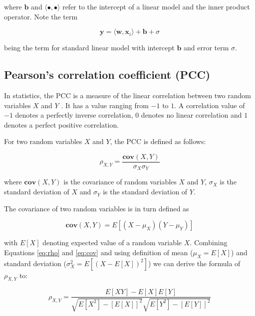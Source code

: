 \documentclass[pdftex,12pt,a4paper]{report}
\begin{document}
where $\mathbf{b}$ and $\langle \bullet , \bullet \rangle$ refer to the intercept of a linear model and  the inner product operator. Note the term

$$
\mathbf{y} = \langle \mathbf{w} , \mathbf{x}_i \rangle + \mathbf{b} + \sigma
$$

being the term for standard linear model with intercept $\mathbf{b}$  and error term $\sigma$.


\subsection{Pearson's correlation coefficient (PCC)}

In statistics, the PCC is a measure of the linear correlation between two random variables $X$ and $Y$ \cite{fahrmeir2016statistik}. It has a value ranging from $-1$ to $1$. A correlation value of $-1$ denotes a perfectly inverse correlation, 0 denotes no linear correlation and $1$ denotes a perfect positive correlation.

For two random variables $X$ and $Y$, the PCC is defined as follows:

\begin{equation}
\rho_{X, Y} = \frac{\mathbf{cov}(X, Y)}{\sigma_X \sigma_Y}
\label{eq:rho}
\end{equation}

where $\mathbf{cov}(X, Y)$ is the covariance of random variables $X$  and $Y$, $\sigma_X$ is the standard deviation of $X$ and $\sigma_Y$ is the standard deviation of $Y$.

The covariance of two random variables is in turn defined as

\begin{equation}
\mathbf{cov}(X, Y) = E[(X - \mu_X)(Y - \mu_Y)]
\label{eq:cov}
\end{equation}

with $E[X]$ denoting expected value of a random variable $X$. Combining Equations \ref{eq:rho} and \ref{eq:cov} and using definition of mean ($\mu_X = E[X]$) and standard deviation ($\sigma^2_X = E[(X - E[X])^2]$) we can derive the formula of $\rho_{X,Y}$ to:

\begin{equation}
\rho_{X, Y} = \frac{E[XY] - E[X]E[Y]}{\sqrt{E[X^2] - [E[X]]^2} \sqrt{E[Y^2] - [E[Y]]^2}}
\label{eq:rho_cov}
\end{equation}
\end{document}
